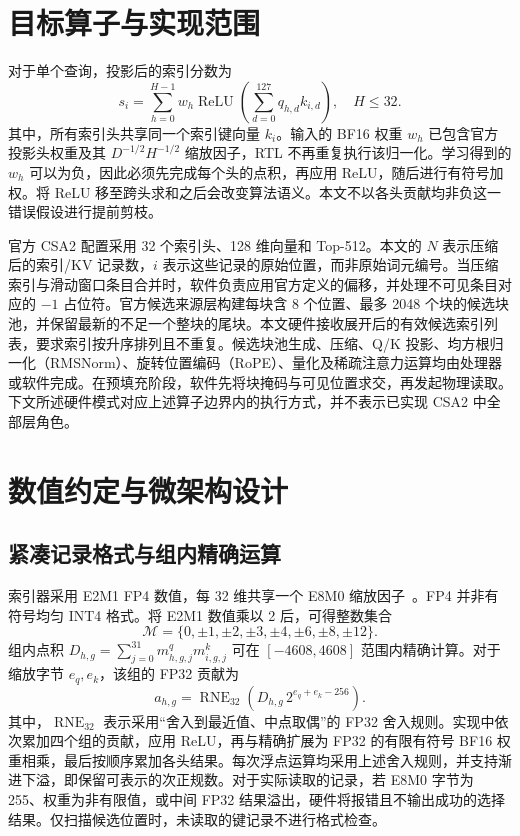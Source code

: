 \section{目标算子与实现范围}
对于单个查询，投影后的索引分数为
\begin{equation}
 s_i=\sum_{h=0}^{H-1}w_h\operatorname{ReLU}\!\left(\sum_{d=0}^{127}q_{h,d}k_{i,d}\right),\quad H\le32.
\label{eq:score}
\end{equation}
其中，所有索引头共享同一个索引键向量 $k_i$。输入的 BF16 权重 $w_h$ 已包含官方投影头权重及其 $D^{-1/2}H^{-1/2}$ 缩放因子，RTL 不再重复执行该归一化。学习得到的 $w_h$ 可以为负，因此必须先完成每个头的点积，再应用 ReLU，随后进行有符号加权。将 ReLU 移至跨头求和之后会改变算法语义。本文不以各头贡献均非负这一错误假设进行提前剪枝。

官方 CSA2 配置采用 32 个索引头、128 维向量和 Top-512。本文的 $N$ 表示压缩后的索引/KV 记录数，$i$ 表示这些记录的原始位置，而非原始词元编号。当压缩索引与滑动窗口条目合并时，软件负责应用官方定义的偏移，并处理不可见条目对应的 $-1$ 占位符。官方候选来源层构建每块含 8 个位置、最多 2048 个块的候选块池，并保留最新的不足一个整块的尾块。本文硬件接收展开后的有效候选索引列表，要求索引按升序排列且不重复。候选块池生成、压缩、Q/K 投影、均方根归一化（RMSNorm）、旋转位置编码（RoPE）、量化及稀疏注意力运算均由处理器或软件完成。在预填充阶段，软件先将块掩码与可见位置求交，再发起物理读取。下文所述硬件模式对应上述算子边界内的执行方式，并不表示已实现 CSA2 中全部层角色。

\section{数值约定与微架构设计}
\subsection{紧凑记录格式与组内精确运算}
索引器采用 E2M1 FP4 数值，每 32 维共享一个 E8M0 缩放因子~\cite{csa2code,mx}。FP4 并非有符号均匀 INT4 格式。将 E2M1 数值乘以 2 后，可得整数集合
\begin{equation}
 \mathcal M=\{0,\pm1,\pm2,\pm3,\pm4,\pm6,\pm8,\pm12\}.
\end{equation}
组内点积 $D_{h,g}=\sum_{j=0}^{31}m^q_{h,g,j}m^k_{i,g,j}$ 可在 $[-4608,4608]$ 范围内精确计算。对于缩放字节 $e_q,e_k$，该组的 FP32 贡献为
\begin{equation}
 a_{h,g}=\operatorname{RNE}_{32}\!\left(D_{h,g}\,2^{e_q+e_k-256}\right).
\end{equation}
其中，$\operatorname{RNE}_{32}$ 表示采用“舍入到最近值、中点取偶”的 FP32 舍入规则。实现中依次累加四个组的贡献，应用 ReLU，再与精确扩展为 FP32 的有限有符号 BF16 权重相乘，最后按顺序累加各头结果。每次浮点运算均采用上述舍入规则，并支持渐进下溢，即保留可表示的次正规数。对于实际读取的记录，若 E8M0 字节为 255、权重为非有限值，或中间 FP32 结果溢出，硬件将报错且不输出成功的选择结果。仅扫描候选位置时，未读取的键记录不进行格式检查。

